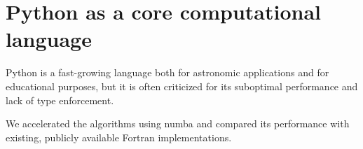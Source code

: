 \section{Python as a core computational language}
\label{sec:python}

Python is a fast-growing language both for astronomic applications\cite{2015arXiv150703989M} and for educational purposes\cite{guo2014python}, but it is often criticized for its suboptimal performance and lack of type enforcement.

We accelerated the algorithms using numba and compared its performance with existing, publicly available Fortran implementations.